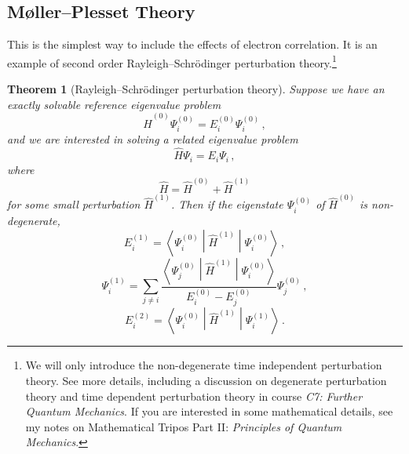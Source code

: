 \documentclass{article}
\theoremstyle{plain}\theoremheaderfont{\normalfont\itshape}\theorembodyfont{\rmfamily}\theoremseparator{.}\newtheorem*{rem}{Remark}\newtheorem*{ex}{Example}\newtheorem*{proof}{Proof}\newtheorem*{altp}{Alternative proof}
\theoremstyle{plain}\theoremheaderfont{\normalfont\bfseries}\theorembodyfont{\rmfamily}\theoremseparator{.}\newtheorem{thm}{Theorem}[section]\newtheorem{lem}[thm]{Lemma}\newtheorem{prop}[thm]{Proposition}\newtheorem*{cor}{Corollary}\newtheorem{defn}[thm]{Definition}\newtheorem{clm}[thm]{Claim}\newtheorem{clminproof}{Claim}
\theoremstyle{break}\theoremheaderfont{\normalfont\itshape}\theorembodyfont{\rmfamily}\theoremseparator{.\medskip}\newtheorem*{proofskip}{Proof}\newtheorem*{exs}{Examples}\newtheorem*{rems}{Remarks}
\theoremstyle{break}\theoremheaderfont{\normalfont\bfseries}\theorembodyfont{\rmfamily}\theoremseparator{.\medskip}\newtheorem{lemskip}[thm]{Lemma}\newtheorem{defnskip}[thm]{Definition}\newtheorem{propskip}[thm]{Proposition}\newtheorem{thmskip}[thm]{Theorem}
\numberwithin{equation}{section}
\newcommand{\mel}[3]{\left\langle #1 \middle| #2 \middle| #3 \right\rangle}
\newcommand{\expval}[2]{\left\langle #2 \middle| #1 \middle| #2 \right\rangle}
\begin{document}
    \subsection{M\o ller--Plesset Theory}
    This is the simplest way to include the effects of electron correlation. It is an example of second order Rayleigh--Schr\"{o}dinger perturbation theory.\footnote{We will only introduce the non-degenerate time independent perturbation theory. See more details, including a discussion on degenerate perturbation theory and time dependent perturbation theory in course \textit{C7: Further Quantum Mechanics}. If you are interested in some mathematical details, see my notes on Mathematical Tripos Part II: \textit{Principles of Quantum Mechanics}.}
    \begin{thm}[Rayleigh--Schr\"{o}dinger perturbation theory]
        Suppose we have an exactly solvable reference eigenvalue problem
        \begin{equation}
            \hat{H}^{(0)}\Psi_i^{(0)}=E_i^{(0)}\Psi_i^{(0)}\,,
        \end{equation}
        and we are interested in solving a related eigenvalue problem
        \begin{equation}
            \hat{H}\Psi_i=E_i\Psi_i\,,
        \end{equation}
        where
        \begin{equation}
            \hat{H}=\hat{H}^{(0)}+\hat{H}^{(1)}
        \end{equation}
        for some small \textit{perturbation} \(\hat{H}^{(1)}\). Then if the eigenstate \(\Psi_i^{(0)}\) of \(\hat{H}^{(0)}\) is non-degenerate,
        \begin{equation}
            E_i^{(1)}=\expval{\hat{H}^{(1)}}{\Psi_i^{(0)}}\,,
        \end{equation}
        \begin{equation}
            \Psi_i^{(1)}=\sum_{j\ne i}\frac{\mel{\Psi_j^{(0)}}{\hat{H}^{(1)}}{\Psi_i^{(0)}}}{E_{i}^{(0)}-E_j^{(0)}}\Psi_j^{(0)}\,,
        \end{equation}
        \begin{equation}
            E_i^{(2)}=\mel{\Psi_i^{(0)}}{\hat{H}^{(1)}}{\Psi_{i}^{(1)}}\,.
        \end{equation}
    \end{thm}
\end{document}
